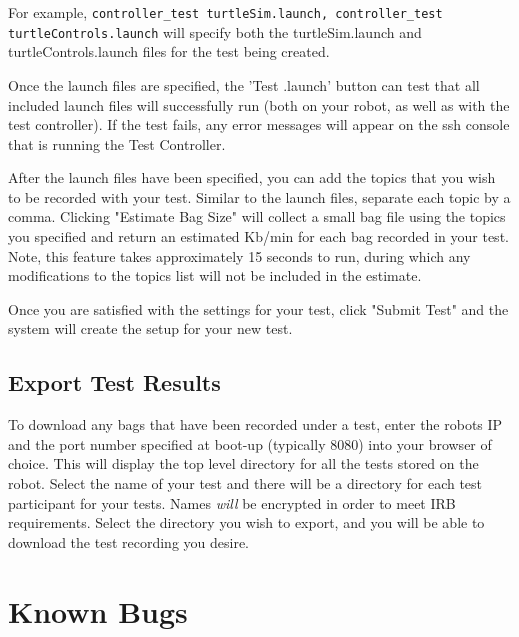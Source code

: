 \documentclass[onecolumn, draftclsnofoot,10pt, compsoc]{report}
\begin{document}
For example, \texttt{controller\_test turtleSim.launch, controller\_test turtleControls.launch} will specify both the turtleSim.launch and turtleControls.launch files for the test being created.

Once the launch files are specified, the 'Test .launch' button can test that all included launch files will successfully run (both on your robot, as well as with the test controller). If the test fails, any error messages will appear on the ssh console that is running the Test Controller. 

After the launch files have been specified, you can add the topics that you wish to be recorded with your test. Similar to the launch files, separate each topic by a comma. Clicking "Estimate Bag Size" will collect a small bag file using the topics you specified and return an estimated Kb/min for each bag recorded in your test. Note, this feature takes approximately 15 seconds to run, during which any modifications to the topics list will not be included in the estimate. 

Once you are satisfied with the settings for your test, click "Submit Test" and the system will create the setup for your new test. 

\subsection{Export Test Results}
To download any bags that have been recorded under a test, enter the robots IP and the port number specified at boot-up (typically 8080) into your browser of choice. This will display the top level directory for all the tests stored on the robot. Select the name of your test and there will be a directory for each test participant for your tests. Names \textit{will} be encrypted in order to meet IRB requirements. Select the directory you wish to export, and you will be able to download the test recording you desire.




\section{Known Bugs}
\end{document}

